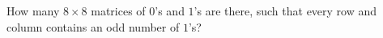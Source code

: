 How many $8 \times 8$ matrices of $0$’s and $1$’s are there, such that every row and column contains an odd number of $1$'s?
